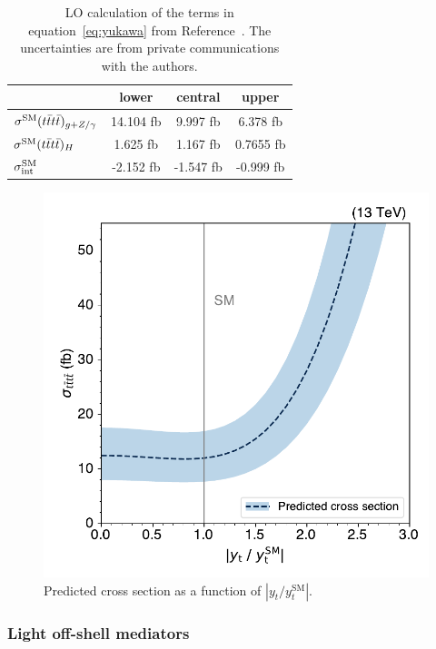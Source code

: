 \begin{table} [h!]
\begin{center}
{\renewcommand{\arraystretch}{1.3}
\begin{tabular}{l|ccc}
\hline
   & lower & central & upper \\
\hline
$ \sigma^{\text{SM}}(t\bar{t}t\bar{t})_{g+Z/\gamma}  $ & 14.104 fb & 9.997 fb &  6.378 fb \\
$ \sigma^{\text{SM}}(t\bar{t}t\bar{t})_H $                  & 1.625 fb &  1.167 fb &  0.7655 fb \\
$\sigma^{\text{SM}}_{\rm int} $                   & -2.152 fb &  -1.547 fb &  -0.999 fb \\
\hline
\end{tabular}}
\caption{LO calculation of the terms in equation~\ref{eq:yukawa} from
Reference~\cite{THEORY:TopYukawaTTTT}.  
The uncertainties are from private communications with the authors.}
\label{tab:yukawa}
\end{center}
\end{table}


\begin{figure}[!htbp]
    \centering
    \includegraphics[width=0.75\linewidth]{figs/ftan/cross_section_yt.pdf}
    \caption{
        Predicted \tttt cross section as a function of $|y_t/y_t^{\text{SM}}|$.
    }
    \label{fig:cross_section_yt}
\end{figure}

\FloatBarrier

\subsubsection{Light off-shell mediators}
\label{sec:ftzprimephi}

